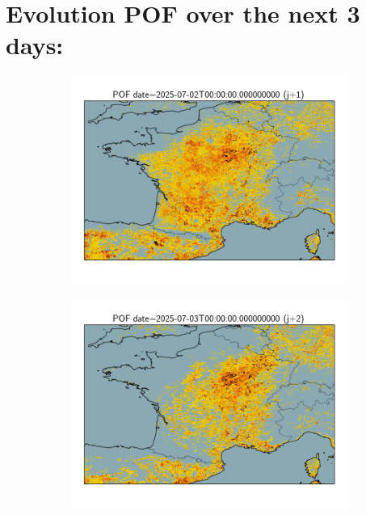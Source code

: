 \documentclass{article}
\begin{document}
\section{Evolution POF over the next 3 days:}
\vspace{-1em}
\begin{figure}[H]
    \centering
    \begin{subfigure}[b]{0.32\textwidth}
        \centering
        \includegraphics[width=\linewidth]{general_pof_j1.png} %
    \end{subfigure}
    \begin{subfigure}[b]{0.32\textwidth}
        \centering
        \includegraphics[width=\linewidth]{general_pof_j2.png} %

\end{subfigure}
\end{figure}
\end{document}
